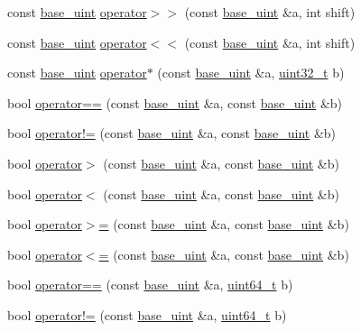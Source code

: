 \begin{DoxyCompactItemize}
\item 
const \hyperlink{classbase__uint}{base\+\_\+uint} \hyperlink{classbase__uint_a9d619adcbf9ad5539f5e98f739edd15d}{operator$>$$>$} (const \hyperlink{classbase__uint}{base\+\_\+uint} \&a, int shift)
\item 
const \hyperlink{classbase__uint}{base\+\_\+uint} \hyperlink{classbase__uint_acee16d973ae59087cd962720773f53dd}{operator$<$$<$} (const \hyperlink{classbase__uint}{base\+\_\+uint} \&a, int shift)
\item 
const \hyperlink{classbase__uint}{base\+\_\+uint} \hyperlink{classbase__uint_a3490f0aef12712d434cda33f913b586f}{operator$\ast$} (const \hyperlink{classbase__uint}{base\+\_\+uint} \&a, \hyperlink{stdint_8h_a435d1572bf3f880d55459d9805097f62}{uint32\+\_\+t} b)
\item 
bool \hyperlink{classbase__uint_aafca305decdfd2ded4688213ab4a55fa}{operator==} (const \hyperlink{classbase__uint}{base\+\_\+uint} \&a, const \hyperlink{classbase__uint}{base\+\_\+uint} \&b)
\item 
bool \hyperlink{classbase__uint_a3cc3bccf252004fbbd2b96dc769378e7}{operator!=} (const \hyperlink{classbase__uint}{base\+\_\+uint} \&a, const \hyperlink{classbase__uint}{base\+\_\+uint} \&b)
\item 
bool \hyperlink{classbase__uint_ac59719bd052d5dc2afcc35ae4a8843ab}{operator$>$} (const \hyperlink{classbase__uint}{base\+\_\+uint} \&a, const \hyperlink{classbase__uint}{base\+\_\+uint} \&b)
\item 
bool \hyperlink{classbase__uint_a89272b5112f90ba683c0f066ba1426c1}{operator$<$} (const \hyperlink{classbase__uint}{base\+\_\+uint} \&a, const \hyperlink{classbase__uint}{base\+\_\+uint} \&b)
\item 
bool \hyperlink{classbase__uint_a9eb243df5a6dfa3d0cd326427d99bfa6}{operator$>$=} (const \hyperlink{classbase__uint}{base\+\_\+uint} \&a, const \hyperlink{classbase__uint}{base\+\_\+uint} \&b)
\item 
bool \hyperlink{classbase__uint_ac7f1bdba7208bd852f7b00f7c49624f8}{operator$<$=} (const \hyperlink{classbase__uint}{base\+\_\+uint} \&a, const \hyperlink{classbase__uint}{base\+\_\+uint} \&b)
\item 
bool \hyperlink{classbase__uint_a977dbbe7e78bbdcc2aea2dc16292d424}{operator==} (const \hyperlink{classbase__uint}{base\+\_\+uint} \&a, \hyperlink{stdint_8h_aaa5d1cd013383c889537491c3cfd9aad}{uint64\+\_\+t} b)
\item 
bool \hyperlink{classbase__uint_ab7b366cc0883f25fa57fb09d4bc33807}{operator!=} (const \hyperlink{classbase__uint}{base\+\_\+uint} \&a, \hyperlink{stdint_8h_aaa5d1cd013383c889537491c3cfd9aad}{uint64\+\_\+t} b)
\end{DoxyCompactItemize}


